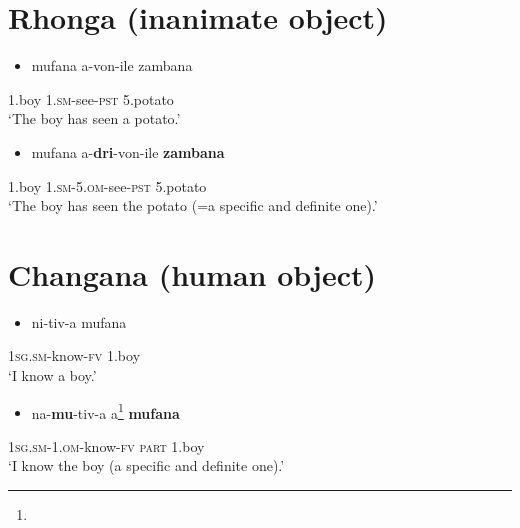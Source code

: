 \documentclass[output=paper]{langsci/langscibook}
\begin{document}
\chapter[]{\rmfamily }
\chapter[Rhonga (inanimate object)]{Rhonga (inanimate object)}
\setcounter{itemize}{0}
\begin{itemize}
\item \gll mufana       a-von-ile                      zambana\\
\end{itemize}
     1.boy          1.\textsc{sm}{}-see-\textsc{pst}                5.potato\\
\glt ‘The boy has seen a potato.’
\z

\begin{itemize}
\item \gll mufana        a-\textbf{dri}{}-von-ile                \textbf{zambana}\\
\end{itemize}
     1.boy           1.\textsc{sm-5.om}{}-see-\textsc{pst}      5.potato\\
\glt ‘The boy has seen the potato (=a specific and definite one).’
\z

\chapter[]{\rmfamily }
\chapter[Changana (human object)]{Changana (human object)}
\setcounter{itemize}{0}
\begin{itemize}
\item \gll ni-tiv-a                           mufana\\
\end{itemize}
     \textsc{1sg.sm}{}-know-\textsc{fv}           1.boy\\
\glt ‘I know a boy.’
\z

\begin{itemize}
\item \gll na-\textbf{mu}{}-tiv-a                            a\footnote{}        \textbf{mufana}\\
\end{itemize}
     \textsc{1sg.sm-1.om}{}-know-\textsc{fv}          \textsc{part}    1.boy\\
\glt ‘I know the boy (a specific and definite one).’
\z
\end{document}
